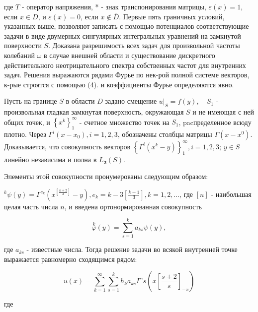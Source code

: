 \documentclass[10pt]{article}
\begin{document}
где $T$ - оператор напряжения, * - знак транспонирования матрицы, $\varepsilon(x)=1$, если $x \in D$, и $\varepsilon(x)=0$, если $x \notin \bar{D}$. Первые пять граничных условий, указанных выше, позволяют записать с помощью потенциалов соответствующие задачи в виде двумерных сингулярных интегральных уравнений на замкнутой поверхности $S$. Доказана разрешимость всех задач для произвольной частоты колебаний $\omega$ в случае внешней области и существование дискретного действительного неотрицательного спектра собственных частот для внутренних задач. Решения выражаются рядами Фурье по нек-рой полной системе векторов, к-рые строятся с помощью (4). и коэффициенты Фурье определяются явно.



Пусть на границе $S$ в области $D$ задано смещение $\left.u\right|_{S}=f(y), \quad S_{1}$ - произвольная гладкая замкнутая поверхность, окружающая $S$ и не имеющая с ней общих точек, и $\left\{x^{k}\right\}_{1}^{\infty}$ - счетное множество точек на $S_{1}$, pacпределенное всюду плотно. Через $\Gamma^{i}\left(x-x_{0}\right), i=1,2,3$, обозначены столбцы матрицы $\Gamma\left(x-x^{0}\right)$. Доказывается, что совокупность векторов $\left\{\Gamma^{i}\left(x^{k}-y\right)\right\}_{1}^{\infty}, i=1,2,3$; $y \in S$ линейно независима и полна в $L_{\mathbf{2}}(S)$.



Элементы этой совокупности пронумерованы следующим образом:



${ }^{k} \psi(y)=\Gamma^{e_{k}}\left(x^{\left[\frac{k+2}{3}\right]}-y\right), e_{k}=k-3\left[\frac{k-1}{3}\right], k=1,2, \ldots$, где $[n]$ - наибольшая целая часть числа $n$, и введена ортонормированная совокупность



\[

\stackrel{k}{\varphi}(y)=\sum_{s=1}^{k} a_{k s} \psi(y),

\]



где $a_{k s}$ - известные числа. Тогда решение задачи во всякой внутренней точке выражается равномерно сходящимся рядом:



\[

u(x)=\sum_{k=1}^{\infty} \sum_{s=1}^{k} h_{k} a_{k s} \Gamma^{e} s\left(x\left[\frac{s+2}{s}\right]_{-x}\right)

\]



где
\end{document}
